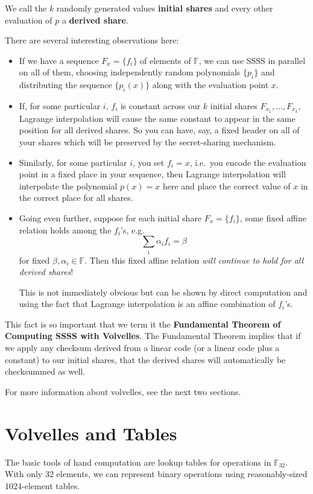 \documentclass[letterpaper]{article}
\newcommand{\fttwo}{\mathbb{F}_{32}}
\begin{document}
We call the $k$ randomly generated values \textbf{initial shares} and
every other evaluation of $p$ a \textbf{derived share}.

There are several interesting observations here:
\begin{itemize}
\item If we have a sequence $F_x = \{f_i\}$ of elements of $\mathbb{F}$, we can use
SSSS in parallel on all of them, choosing independently random polynomials
$\{p_i\}$ and distributing the sequence $\{p_i(x)\}$ along with the evaluation
point $x$.
\item If, for some particular $i$, $f_i$ is constant across our $k$ initial
shares $F_{x_1},\ldots,F_{x_k}$, Lagrange interpolation will cause the same
constant to appear in the same position for all derived shares. So you can
have, say, a fixed header on all of your shares which will be preserved by
the secret-sharing mechanism.
\item Similarly, for some particular $i$, you set $f_i=x$, i.e.~you encode the
evaluation point in a fixed place in your sequence, then Lagrange interpolation
will interpolate the polynomial $p(x) = x$ here and place the correct value
of $x$ in the correct place for all shares.
\item Going even further, suppose for each initial share $F_x=\{f_i\}$, some fixed
affine relation holds among the $f_i$'s, e.g.
\[ \sum_i \alpha_i f_i = \beta \]
for fixed $\beta,\alpha_i\in \mathbb{F}$. Then this fixed affine relation
\emph{will continue to hold for all derived shares}!

This is not immediately obvious but can be shown by direct computation and
using the fact that Lagrange interpolation is an affine combination of $f_i$'s.
\end{itemize}

This fact is so important that we term it the \textbf{Fundamental Theorem of
Computing SSSS with Volvelles}. The Fundamental Theorem implies that if we
apply any checksum derived from a linear code (or a linear code plus a
constant) to our initial shares, that the derived shares will automatically
be checksummed as well.

For more information about volvelles, see the next two sections.

\section{Volvelles and Tables}

The basic tools of hand computation are lookup tables for operations in $\fttwo$.
With only 32 elements, we can represent binary operations using reasonably-sized
1024-element tables.
\end{document}

